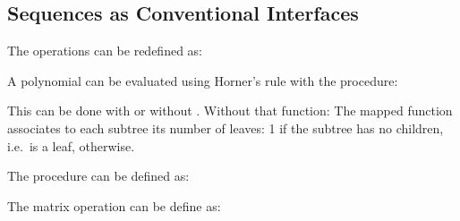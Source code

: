 \subsection{Sequences as Conventional Interfaces}

\begin{exe}[2.33]
    The operations can be redefined as:
\end{exe}

\begin{exe}[2.34]
    A polynomial can be evaluated using Horner’s rule with the procedure:
\end{exe}

\begin{exe}[2.35]
    This can be done with or without . Without that function:
    The mapped function associates to each subtree its number of leaves: 1 if 
    the subtree has no children, i.e.\ is a leaf,  
    otherwise.
\end{exe}

\begin{exe}[2.36]
    The procedure  can be defined as:
\end{exe}

\begin{exe}[2.37]
    The matrix operation can be define as:
\end{exe}

